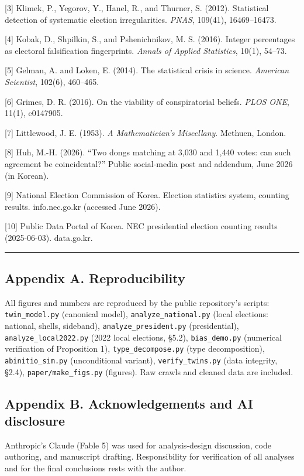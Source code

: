 \documentclass[
  11pt,
]{article}
\begin{document}
{[}3{]} Klimek, P., Yegorov, Y., Hanel, R., and Thurner, S. (2012).
Statistical detection of systematic election irregularities.
\emph{PNAS}, 109(41), 16469--16473.

{[}4{]} Kobak, D., Shpilkin, S., and Pshenichnikov, M. S. (2016).
Integer percentages as electoral falsification fingerprints.
\emph{Annals of Applied Statistics}, 10(1), 54--73.

{[}5{]} Gelman, A. and Loken, E. (2014). The statistical crisis in
science. \emph{American Scientist}, 102(6), 460--465.

{[}6{]} Grimes, D. R. (2016). On the viability of conspiratorial
beliefs. \emph{PLOS ONE}, 11(1), e0147905.

{[}7{]} Littlewood, J. E. (1953). \emph{A Mathematician's Miscellany}.
Methuen, London.

{[}8{]} Huh, M.-H. (2026). ``Two dongs matching at 3,030 and 1,440
votes: can such agreement be coincidental?'' Public social-media post
and addendum, June 2026 (in Korean).

{[}9{]} National Election Commission of Korea. Election statistics
system, counting results. info.nec.go.kr (accessed June 2026).

{[}10{]} Public Data Portal of Korea. NEC presidential election counting
results (2025-06-03). data.go.kr.

\begin{center}\rule{0.5\linewidth}{0.5pt}\end{center}

\subsection{Appendix A.
Reproducibility}\label{appendix-a.-reproducibility}

All figures and numbers are reproduced by the public repository's
scripts: \texttt{twin\_model.py} (canonical model),
\texttt{analyze\_national.py} (local elections: national, shells,
sideband), \texttt{analyze\_president.py} (presidential),
\texttt{analyze\_local2022.py} (2022 local elections, §5.2),
\texttt{bias\_demo.py} (numerical verification of Proposition 1),
\texttt{type\_decompose.py} (type decomposition),
\texttt{abinitio\_sim.py} (unconditional variant),
\texttt{verify\_twins.py} (data integrity, §2.4),
\texttt{paper/make\_figs.py} (figures). Raw crawls and cleaned data are
included.

\subsection{Appendix B. Acknowledgements and AI
disclosure}\label{appendix-b.-acknowledgements-and-ai-disclosure}

Anthropic's Claude (Fable 5) was used for analysis-design discussion,
code authoring, and manuscript drafting. Responsibility for verification
of all analyses and for the final conclusions rests with the author.
\end{document}
